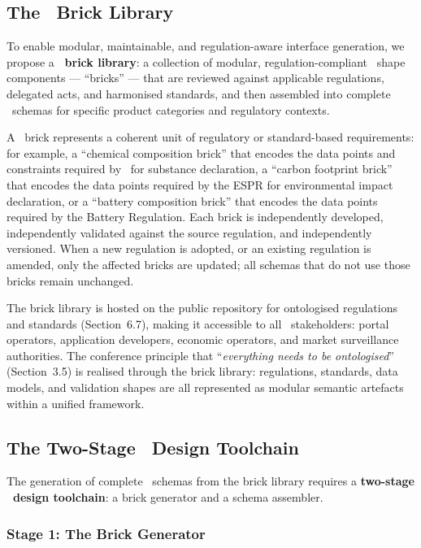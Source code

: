 \subsection{The \SHACL\ Brick Library}

To enable modular, maintainable, and regulation-aware interface generation, we
propose a \textbf{\SHACL\ brick library}: a collection of modular,
regulation-compliant \SHACL\ shape components --- ``bricks'' --- that are
reviewed against applicable regulations, delegated acts, and harmonised
standards, and then assembled into complete \SHACL\ schemas for specific product
categories and regulatory contexts.

A \SHACL\ brick represents a coherent unit of regulatory or standard-based
requirements: for example, a ``chemical composition brick'' that encodes the
data points and constraints required by \REACH\ for substance declaration, a
``carbon footprint brick'' that encodes the data points required by the ESPR for
environmental impact declaration, or a ``battery composition brick'' that
encodes the data points required by the Battery Regulation. Each brick is
independently developed, independently validated against the source regulation,
and independently versioned. When a new regulation is adopted, or an existing
regulation is amended, only the affected bricks are updated; all schemas that do
not use those bricks remain unchanged.

The brick library is hosted on the public repository for ontologised regulations
and standards (Section~6.7), making it accessible to all \DPP\ stakeholders:
portal operators, application developers, economic operators, and market
surveillance authorities. The conference principle that ``\textit{everything
needs to be ontologised}'' (Section~3.5) is realised through the brick library:
regulations, standards, data models, and validation shapes are all represented
as modular semantic artefacts within a unified framework.

\subsection{The Two-Stage \SHACL\ Design Toolchain}

The generation of complete \SHACL\ schemas from the brick library requires a
\textbf{two-stage \SHACL\ design toolchain}: a brick generator and a schema
assembler.

\subsubsection{Stage 1: The Brick Generator}

